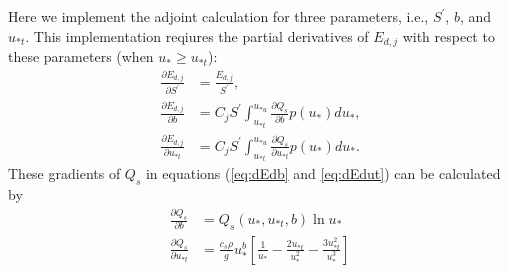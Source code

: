    Here we implement the adjoint calculation for three parameters, i.e., 
   $S^\prime$, $b$, and $u_{*t}$. This implementation reqiures the partial
   derivatives of $E_{d,j}$ with respect to these parameters (when 
   $u_* \geq u_{*t}$): 
   \begingroup
   \allowdisplaybreaks
   \begin{align}
     \frac{\partial E_{d,j}}{\partial S^\prime} 
       &= \frac{E_{d,j}}{S^\prime}\mbox{,} \\
     \frac{\partial E_{d,j}}{\partial b} 
       &= C_j S^\prime \int^{u_{*u}}_{u_{*t}} 
          \frac{\partial Q_s}{\partial b} p(u_*) d u_* \mbox{,} \label{eq:dEdb}\\
     \frac{\partial E_{d,j}}{\partial u_{*t}}
       & = C_j S^\prime \int^{u_{*u}}_{u_{*t}} 
          \frac{\partial Q_s}{\partial u_{*t}} p(u_*) d u_* \mbox{.} \label{eq:dEdut}
   \end{align}
   \endgroup
   These gradients of $Q_s$ in equations (\ref{eq:dEdb} and \ref{eq:dEdut}) can be 
   calculated by
   \begingroup
   \allowdisplaybreaks
   \begin{align}
   \frac{\partial Q_s}{\partial b} &= Q_s(u_*,u_{*t},b) \ln{u_*} \\
   \frac{\partial Q_s}{\partial u_{*t}} &=\frac{c_s \rho}{g} u_*^b
         \left[\frac{1}{u_*} - \frac{2u_{*t}}{u_*^2} 
         - \frac{3u_{*t}^2}{u_*^3}\right] 
   \end{align}
   \endgroup
